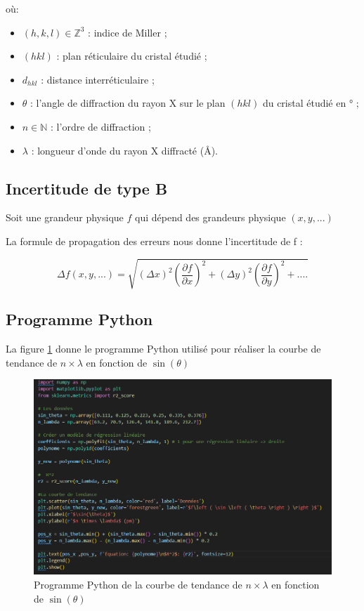 \documentclass[12pt,a4paper]{article}
\begin{document}
où:

\begin{itemize}
	
		\item $\left ( h,k,l \right ) \in \mathbb{Z}^3$ : indice de Miller ;
	
	\item $(hkl)$ : plan réticulaire du cristal étudié ;
	
	\item $d_{hkl}$ : distance interréticulaire ;
	 
	
	\item $\theta $ : l'angle de diffraction du rayon X sur le plan $(hkl)$ du cristal étudié en ° ;
	
	\item $n \in \mathbb{N}$ : l'ordre de diffraction ;
	
	\item $\lambda $ : longueur d'onde du rayon X diffracté (\AA).
\end{itemize}
\subsection{Incertitude de type B}
Soit une grandeur physique $f$ qui dépend des grandeurs physique $(x,y,...)$ 

La formule de propagation des erreurs nous donne l'incertitude de f :

\begin{equation}\label{eq: Type B}
	\Delta f(x,y,...) = \sqrt{\left ( \Delta x \right )^2 \left ( \frac{\partial f}{\partial x} \right )^2 + \left ( \Delta y \right )^2 \left ( \frac{\partial f}{\partial y} \right )^2 + .... }
\end{equation}

\newpage
\subsection{Programme Python}
La figure \ref{fig:photocode} donne le programme Python utilisé pour réaliser la courbe de tendance de $n \times \lambda$ en fonction de $\sin(\theta)$
\begin{figure}[h!]
	\centering
	\includegraphics[width=1\linewidth]{Python/Photo_code}
	\caption{Programme Python de la courbe de tendance de $n \times \lambda$ en fonction de $\sin(\theta)$}
	\label{fig:photocode}
\end{figure}
\end{document}
